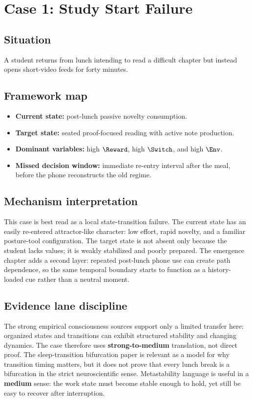 \section{Case 1: Study Start Failure}

\subsection*{Situation}
A student returns from lunch intending to read a difficult chapter but instead
opens short-video feeds for forty minutes.

\subsection*{Framework map}
\begin{itemize}[nosep]
  \item \textbf{Current state:} post-lunch passive novelty consumption.
  \item \textbf{Target state:} seated proof-focused reading with active note
        production.
  \item \textbf{Dominant variables:} high $\Reward$, high $\Switch$, and high
        $\Env$.
  \item \textbf{Missed decision window:} immediate re-entry interval after the
        meal, before the phone reconstructs the old regime.
\end{itemize}

\subsection*{Mechanism interpretation}
This case is best read as a local state-transition failure. The current state
has an easily re-entered attractor-like character: low effort, rapid novelty,
and a familiar posture-tool configuration. The target state is not absent only
because the student lacks values; it is weakly stabilized and poorly prepared.
The emergence chapter adds a second layer: repeated post-lunch phone use can
create path dependence, so the same temporal boundary starts to function as a
history-loaded cue rather than a neutral moment.

\subsection*{Evidence lane discipline}
The strong empirical consciousness sources support only a limited transfer
here: organized states and transitions can exhibit structured stability and
changing dynamics. The case therefore uses \textbf{strong-to-medium}
translation, not direct proof. The sleep-transition bifurcation paper is
relevant as a model for why transition timing matters, but it does not prove
that every lunch break is a bifurcation in the strict neuroscientific sense.
Metastability language is useful in a \textbf{medium} sense: the work state
must become stable enough to hold, yet still be easy to recover after
interruption.

